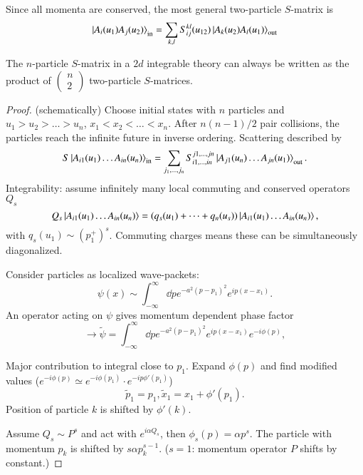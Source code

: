 Since all momenta are conserved, the most general two-particle $S$-matrix is
\begin{equation}
	\ket{A_i (u_1) A_j (u_2)}_{\text{in}} = \sum_{k, l} S^{kl}_{ij} (u_{12}) \ket{A_k(u_2) A_l(u_1)}_{\text{out}}
\end{equation}

\begin{prop}
The $n$-particle $S$-matrix in a $2d$ integrable theory can always be written as the product of $ \begin{pmatrix} n \\ 2 \end{pmatrix}$ two-particle $S$-matrices.
\end{prop}

\begin{proof} (schematically)
Choose initial states with $n$ particles and $u_1 > u_2 > \dots > u_n$, $x_1 < x_2 < \dots < x_n$. After $n(n-1)/2$ pair collisions, the particles reach the infinite future in inverse ordering. Scattering described by 
\begin{equation*}
	S \ket{A_{i1} (u_1) \dots A_{in} (u_n)}_{\text{in}} =\sum_{j_1, \dots, j_n} S_{i1, \dots, in}^{j1, \dots, jn} \ket{A_{j1}(u_n) \dots A_{jn}(u_1)}_{\text{out}}.
\end{equation*}
Integrability: assume infinitely many local commuting and conserved operators $Q_s$
\begin{equation*}
	Q_s \ket{A_{i1} (u_1) \dots A_{in} (u_n)} =(q_s(u_1) + \dots + q_n(u_s)) \ket{A_{i1}(u_1) \dots A_{in}(u_n)},
\end{equation*}
with $q_s(u_1) \sim (p_1^+)^s$. Commuting charges means these can be simultaneously diagonalized. 

Consider particles as localized wave-packets:
\begin{equation*}
	\psi(x) \sim \int_{-\infty}^{\infty} \dd{p} e^{-a^2(p-p_1)^2} e^{i p (x - x_1)}.
\end{equation*}
An operator acting on $\psi$ gives momentum dependent phase factor 
\begin{equation*}
	\rightarrow \tilde{\psi} = \int_{-\infty}^{\infty} \dd{p} e^{-a^2(p-p_1)^2} e^{ip(x-x_1)} e^{-i\phi(p)},
\end{equation*}

Major contribution to integral close to $p_1$. Expand $\phi(p)$ and find modified values ($e^{-i\phi(p)} \simeq e^{-i\phi(p_1)} \cdot e^{-ip \phi'(p_1)}$)
\begin{equation*}
	\tilde{p}_1 = p_1, \tilde{x}_1 = x_1 + \phi'(p_1).
\end{equation*}
Position of particle $k$ is shifted by $\phi'(k)$.

Assume $Q_s \sim P^s$ and act with $e^{i\alpha Q_s}$, then $\phi_s(p) = \alpha p^s$. The particle with momentum $p_k$ is shifted by $s \alpha p_k^{s-1}$. ($s=1$: momentum operator $P$ shifts by constant.)
\end{proof}

